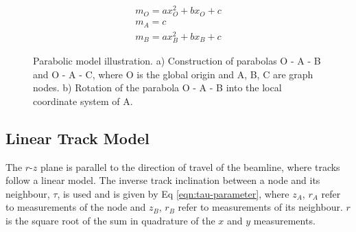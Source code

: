 \begin{equation}
\begin{aligned}
m_O = ax_{O}^{2} + bx_O + c \\
m_A = c \\
m_B = ax_{B}^{2} + bx_B + c
\end{aligned}
\label{eqn:parabolic-equations}
\end{equation}

\begin{figure}[htbp!] 
    \centering
    \hfill%
    \caption{Parabolic model illustration. a) Construction of parabolas O - A - B and O - A - C, where O is the global origin and A, B, C are graph nodes. b) Rotation of the parabola O - A - B into the local coordinate system of A.}
    \label{fig:gnn-parabolic-model}
\end{figure}


\subsection{Linear Track Model}
\label{linear-state}

The $r$-$z$ plane is parallel to the direction of travel of the beamline, where tracks follow a linear model. The inverse track inclination between a node and its neighbour, $\tau$, is used and is given by Eq \eqref{eqn:tau-parameter}, where $z_A$, $r_A$ refer to measurements of the node and $z_B$, $r_B$ refer to measurements of its neighbour. $r$ is the square root of the sum in quadrature of the $x$ and $y$ measurements.

